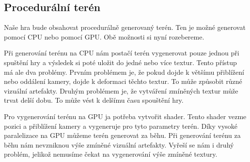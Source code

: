 









\subsection{Procedurální terén}
Naše hra bude obsahovat procedurálně generovaný terén. Ten je možné generovat pomocí CPU nebo pomocí GPU. Obě možnosti si nyní rozebereme.

Při generování terénu na CPU nám postačí terén vygenerovat pouze jednou při spuštění hry a výsledek si poté uložit do jedné nebo více textur. Tento přístup má ale dva problémy. Prvním problémem je, že pokud dojde k většímu přiblížení nebo oddálení kamery, dojde k deformaci těchto textur. To může způsobit různé vizuální artefakty. Druhým problémem je, že vytváření zmíněných textur může trvat delší dobu. To může vést k delšímu času spouštění hry.

Pro vygenerování terénu na GPU ja potřeba vytvořit shader. Tento shader vezme pozici a přiblížení kamery a vygeneruje pro tyto parametry terén. Díky vysoké paralelizace na GPU můžeme terén generovat za běhu. Při generování terénu za běhu nám nevzniknou výše zmíněné vizuální artefakty. Vyřeší se nám i druhý problém, jelikož nemusíme čekat na vygenerování výše zmíněné textury.

